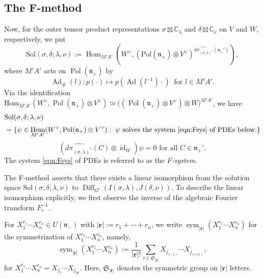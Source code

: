 \documentclass[a4paper,11pt,reqno]{amsart}
\newcommand{\frakn}{\mathfrak{n}}
\newcommand{\0}{{\bf 0}}
\newcommand{\C}{\mathbb{C}}
\newcommand{\1}{{\bf 1}}
\DeclareMathOperator{\Ad}{Ad}
\DeclareMathOperator{\Hom}{Hom}
\DeclareMathOperator{\Pol}{Pol}
\DeclareMathOperator{\id}{id}
\DeclareMathOperator{\Diff}{Diff}
\DeclareMathOperator{\sym}{sym}
\theoremstyle{plain}
\theoremstyle{definition}
\numberwithin{equation}{section}
\theoremstyle{definition}
\begin{document}
\subsection{The F-method}
\label{sec:Fmethod2}
Now, 
for the outer tensor product representations 
$\sigma \boxtimes \C_\lambda$ and $\delta \boxtimes \C_\nu$
on $V$ and $W$, respectively, we put
\begin{equation}\label{eqn:Sol2a}
\mathrm{Sol}(\sigma,\delta;\lambda,\nu):=
\operatorname{Hom}_{M'A'}(W^\vee,
(\mathrm{Pol}(\mathfrak{n}_+) 
\otimes V^\vee)^{\widehat{d\pi_{(\sigma,\lambda)^*}}(\frakn_+')}),
\end{equation}
where $M'A'$ acts on $\Pol(\frakn_+)$ by
\begin{equation}\label{eqn:sharp}
\Ad_{\#}(l) \colon p(\cdot) \mapsto p(\Ad(l^{-1})\cdot)
\;\; \text{for $l \in M'A'$}.
\end{equation}
Via the identification
$\textrm{Hom}_{M'A'}(W^\vee, \Pol(\frakn_+)\otimes V^\vee)
\simeq
\big((\Pol(\frakn_+)\otimes V^\vee) \otimes W\big)^{M'A'}$,
we have
\begin{align}\label{eqn:Sol}
&\mathrm{Sol}(\sigma,\delta;\lambda,\nu)\nonumber \\[3pt]
&=\{ \psi \in \Hom_{M'A'}(W^\vee, \Pol(\frakn_+)\otimes V^\vee): 
\text{
$\psi$ solves the system \eqref{eqn:Fsys} of PDEs below.}\}
\end{align}
\begin{equation}\label{eqn:Fsys}
(\widehat{d\pi_{(\sigma,\lambda)^*}}(C) \otimes \id_W)\psi=0
\,\,
\text{for all $C \in \frakn_+'$}.
\end{equation}
The system \eqref{eqn:Fsys} of PDEs is referred to
as the \emph{F-system}.

The F-method asserts that there exists a linear isomorphism
from the solution space $\mathrm{Sol}(\sigma,\delta;\lambda,\nu)$ to
$\Diff_{G'}(I(\sigma,\lambda),J(\delta,\nu))$.
To describe the linear isomorphism explicitly, we first observe 
the inverse of the algebraic Fourier transform $F_c^{-1}$.

For $X_1^{r_1}\cdots X_n^{r_n} \in U(\frakn_-)$ with 
$|\mathbf{r}|:= r_1+\cdots+r_n$,
we write $\sym_{|\mathbf{r}|}(X_1^{r_1}\cdots X_n^{r_n})$ 
for the symmetrization of $X_1^{r_1}\cdots X_n^{r_n}$, namely,
\begin{equation}\label{eqn:symm}
\sym_{|\mathbf{r}|}(X_1^{r_1}\cdots X_n^{r_n}):=
\frac{1}{|\mathbf{r}|!}\sum_{\tau \in \mathfrak{S}_{|\mathbf{r}|}}
X_{j_{\tau(1)}} \cdots X_{j_{\tau(|r|)}},
\end{equation}
for $X_1^{r_1}\cdots X_n^{r_n}=X_{j_1}\cdots X_{j_{|\mathbf{r}|}}$.
Here, $\mathfrak{S}_{|\mathbf{r}|}$ denotes the symmetric group on 
$|\mathbf{r}|$ letters. 
\end{document}
